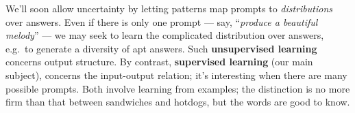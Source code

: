   We'll soon allow uncertainty by letting patterns map prompts to
  \emph{distributions} over answers.
  Even if there is only one prompt --- say, ``\emph{produce a
  beautiful melody}'' --- we may seek to learn the complicated
  distribution over answers, e.g.\ to generate a diversity of apt
  answers.  Such \textbf{unsupervised learning} concerns output
  structure.
  By contrast, \textbf{supervised learning} (our main subject), concerns
  the input-output relation; it's interesting when there are many possible prompts.
  Both involve learning from examples; the distinction is no more firm
  than that between sandwiches and hotdogs, but the words are good to
  know.


